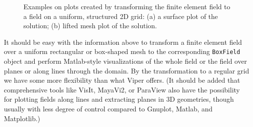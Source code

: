 \begin{figure}
\label{langtangen:poisson:2D:fig3}
  \centerline{
}
  \centerline{
}
  \caption{
  Examples on plots created by transforming the finite element field to
  a field on a uniform, structured 2D grid:
  (a) a surface plot of the solution; (b) lifted mesh plot of the solution.
  }
\end{figure}



It should be easy with the information above to transform a finite element
field over a uniform rectangular or box-shaped mesh to the corresponding
{\fontsize{10pt}{10pt}\texttt{BoxField}} object and perform Matlab-style
visualizations of the whole field or
the field over planes or along lines through the domain.
By the transformation to a regular grid we have some more flexibility
than what Viper offers. (It should be added that
comprehensive tools like
VisIt, MayaVi2, or ParaView also have the possibility for plotting fields
along lines and extracting planes in 3D geometries, though usually with
less degree of control compared to Gnuplot, Matlab, and Matplotlib.)

